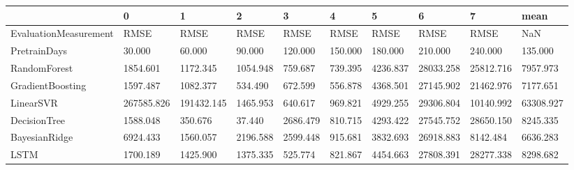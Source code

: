 \begin{tabular}{llllllllll}
\toprule
{} &          0 &          1 &        2 &        3 &       4 &        5 &         6 &         7 &      mean \\
\midrule
EvaluationMeasurement &       RMSE &       RMSE &     RMSE &     RMSE &    RMSE &     RMSE &      RMSE &      RMSE &       NaN \\
PretrainDays          &     30.000 &     60.000 &   90.000 &  120.000 & 150.000 &  180.000 &   210.000 &   240.000 &   135.000 \\
RandomForest          &   1854.601 &   1172.345 & 1054.948 &  759.687 & 739.395 & 4236.837 & 28033.258 & 25812.716 &  7957.973 \\
GradientBoosting      &   1597.487 &   1082.377 &  534.490 &  672.599 & 556.878 & 4368.501 & 27145.902 & 21462.976 &  7177.651 \\
LinearSVR             & 267585.826 & 191432.145 & 1465.953 &  640.617 & 969.821 & 4929.255 & 29306.804 & 10140.992 & 63308.927 \\
DecisionTree          &   1588.048 &    350.676 &   37.440 & 2686.479 & 810.715 & 4293.422 & 27545.752 & 28650.150 &  8245.335 \\
BayesianRidge         &   6924.433 &   1560.057 & 2196.588 & 2599.448 & 915.681 & 3832.693 & 26918.883 &  8142.484 &  6636.283 \\
LSTM                  &   1700.189 &   1425.900 & 1375.335 &  525.774 & 821.867 & 4454.663 & 27808.391 & 28277.338 &  8298.682 \\
\bottomrule
\end{tabular}
